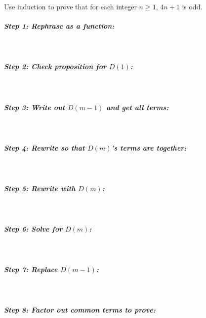         \begin{questionNOGRADE}{\thequestion}
            Use induction to prove that for each integer $n \geq 1$, $4n+1$ is odd.

            \subparagraph{Step 1: Rephrase as a function:} ~\\
            
            \subparagraph{Step 2: Check proposition for $D(1)$:} ~\\

            \subparagraph{Step 3: Write out $D(m-1)$ and get all terms:} ~\\      

            \subparagraph{Step 4: Rewrite so that $D(m)$'s terms are together:} ~\\

            \subparagraph{Step 5: Rewrite with $D(m)$:}~\\

            \subparagraph{Step 6: Solve for $D(m)$:}~\\

            \subparagraph{Step 7: Replace $D(m-1)$:}~\\

            \subparagraph{Step 8: Factor out common terms to prove:}~\\
        \end{questionNOGRADE}

